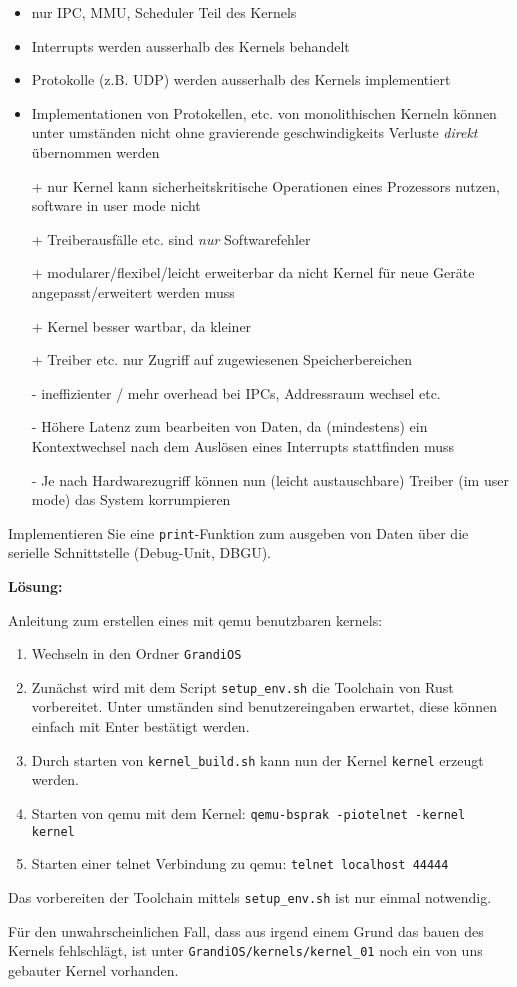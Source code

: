\begin{description}
\begin{itemize}
  \item nur IPC, MMU, Scheduler Teil des Kernels
  \item Interrupts werden ausserhalb des Kernels behandelt
  \item Protokolle (z.B. UDP) werden ausserhalb des Kernels implementiert
  \item Implementationen von Protokellen, etc. von monolithischen Kerneln können unter umständen nicht ohne gravierende geschwindigkeits Verluste \emph{direkt} übernommen werden
  \item[+] nur Kernel kann sicherheitskritische Operationen eines Prozessors nutzen, software in user mode nicht
  \item[+] Treiberausfälle etc. sind \emph{nur} Softwarefehler
  \item[+] modularer/flexibel/leicht erweiterbar da nicht Kernel für neue Geräte angepasst/erweitert werden muss
  \item[+] Kernel besser wartbar, da kleiner
  \item[+] Treiber etc. nur Zugriff auf zugewiesenen Speicherbereichen
  \item[-] ineffizienter / mehr overhead bei IPCs, Addressraum wechsel etc.
  \item[-] Höhere Latenz zum bearbeiten von Daten, da (mindestens) ein Kontextwechsel nach dem Auslösen eines Interrupts stattfinden muss
  \item[-] Je nach Hardwarezugriff können nun (leicht austauschbare) Treiber (im user mode) das System korrumpieren
\end{itemize}



Implementieren Sie eine \texttt{print}-Funktion zum ausgeben von Daten über die serielle Schnittstelle (Debug-Unit, DBGU).

\textbf{Lösung:}

Anleitung zum erstellen eines mit qemu benutzbaren kernels:
\begin{enumerate}
	\item Wechseln in den Ordner \texttt{GrandiOS}
	\item Zunächst wird mit dem Script \texttt{setup\_env.sh} die Toolchain von Rust vorbereitet. Unter umständen sind benutzereingaben erwartet, diese können einfach mit Enter bestätigt werden.
	\item Durch starten von \texttt{kernel\_build.sh} kann nun der Kernel \texttt{kernel} erzeugt werden.
	\item Starten von qemu mit dem Kernel: \texttt{qemu-bsprak -piotelnet -kernel kernel}
	\item Starten einer telnet Verbindung zu qemu: \texttt{telnet localhost 44444}
\end{enumerate}
Das vorbereiten der Toolchain mittels \texttt{setup\_env.sh} ist nur einmal notwendig.

Für den unwahrscheinlichen Fall, dass aus irgend einem Grund das bauen des Kernels fehlschlägt, ist unter \texttt{GrandiOS/kernels/kernel\_01} noch ein von uns gebauter Kernel vorhanden.

\end{description}

